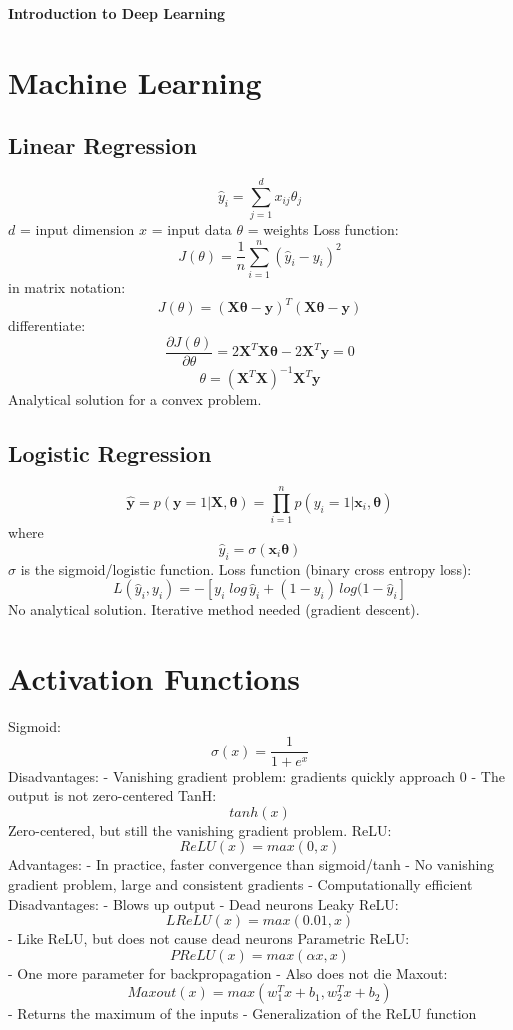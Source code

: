 \documentclass{scrartcl}
\begin{document}
\onehalfspacing
\obeylines
\setlength{\parindent}{0pt}
\begin{center}\LARGE\textbf{Introduction to Deep Learning}\end{center}


\section*{Machine Learning}
\subsection*{Linear Regression}
$$\hat{y}_i = \sum_{j=1}^{d} x_{ij} \theta_j$$
$d$ = input dimension
$x$ = input data
$\theta$ = weights
Loss function:
$$J(\theta) = \frac{1}{n} \sum_{i=1}^{n} (\hat{y}_i - y_i)^2$$
in matrix notation:
$$J(\theta) = (\mathbf{X\theta} - \mathbf{y})^T(\mathbf{X\theta} - \mathbf{y})$$
differentiate:
$$\frac{\partial J(\theta)}{\partial \theta} = 2\mathbf{X}^T\mathbf{X\theta} - 2\mathbf{X}^T\mathbf{y} = 0$$
$$\theta = (\mathbf{X}^T\mathbf{X})^{-1}\mathbf{X}^T\mathbf{y}$$
Analytical solution for a convex problem.

\subsection*{Logistic Regression}
$$\mathbf{\hat{y}} = p(\mathbf{y} = 1 | \mathbf{X}, \mathbf{\theta}) = \prod_{i=1}^{n} p(y_i = 1 | \mathbf{x}_i, \mathbf{\theta})$$
where
$$\hat{y}_i = \sigma(\mathbf{x}_i\mathbf{\theta})$$
$\sigma$ is the sigmoid/logistic function.
Loss function (binary cross entropy loss):
$$L(\hat{y}_i, y_i) = -[y_i \; log \, \hat{y}_i + (1 - y_i) \, log(1 - \hat{y}_i]$$
No analytical solution. Iterative method needed (gradient descent).


\section*{Activation Functions}
Sigmoid:
$$\sigma (x) = \frac{1}{1 + e^{x}}$$
Disadvantages:
- Vanishing gradient problem: gradients quickly approach 0
- The output is not zero-centered
TanH:
$$tanh(x)$$
Zero-centered, but still the vanishing gradient problem.
ReLU:
$$ReLU(x) = max(0, x)$$
Advantages:
- In practice, faster convergence than sigmoid/tanh
- No vanishing gradient problem, large and consistent gradients
- Computationally efficient
Disadvantages:
- Blows up output
- Dead neurons
Leaky ReLU:
$$LReLU(x) = max(0.01, x)$$
- Like ReLU, but does not cause dead neurons
Parametric ReLU:
$$PReLU(x) = max(\alpha x, x)$$
- One more parameter for backpropagation
- Also does not die
Maxout:
$$Maxout(x) = max(w^T_1 x + b_1, w^T_2 x + b_2)$$
- Returns the maximum of the inputs
- Generalization of the ReLU function
\end{document}
